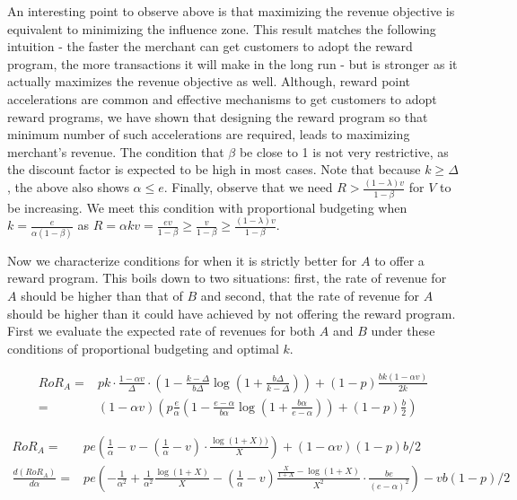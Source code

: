 An interesting point to observe above is that maximizing the revenue objective is equivalent to minimizing the influence zone.
This result matches the following intuition - the faster the merchant can get customers to adopt the reward program, the more transactions it will make in the long run - but is stronger as it actually maximizes the revenue objective as well. 
Although, reward point accelerations are common and effective mechanisms to get customers to adopt reward programs, we have shown that designing the reward program so that minimum number of such accelerations are required, leads to maximizing merchant's revenue. 
The condition that $\beta$ be close to 1 is not very restrictive, as the discount factor is expected to be high in most cases. 
Note that because $k \geq \Delta$, the above also shows $\alpha \leq e$. 
Finally, observe that we need $R > \frac{(1-\lambda)v}{1-\beta}$ for $V$ to be increasing. 
We meet this condition with proportional budgeting when $k = \frac{e}{\alpha(1-\beta)}$ as $R = \alpha k v = \frac{e v}{1-\beta} \geq \frac{v}{1-\beta} \geq \frac{(1-\lambda)v}{1-\beta}$. 

Now we characterize conditions for when it is strictly better for $A$ to offer a reward program.
This boils down to two situations: first, the rate of revenue for $A$ should be higher than that of $B$ and second, that the rate of revenue for $A$ should be higher than it could have achieved by not offering the reward program.
First we evaluate the expected rate of revenues for both $A$ and $B$ under these conditions of proportional budgeting and optimal $k$.

\begin{align*}
RoR_A =& pk\cdot\frac{1-\alpha v}{\Delta}\cdot\left(1 - \frac{k-\Delta}{b\Delta}\log\left(1+\frac{b\Delta}{k-\Delta}\right)\right) + (1-p)\frac{bk(1-\alpha v)}{2k}\\
      =& (1-\alpha v) \left(p\frac{e}{\alpha}\left(1-\frac{e-\alpha}{b\alpha}\log\left(1+\frac{b\alpha}{e-\alpha}\right)\right) + (1-p)\frac{b}{2}\right)
\end{align*}

\begin{align*}
RoR_A =& pe \left(\frac{1}{\alpha} - v - \left(\frac{1}{\alpha} - v\right)\cdot \frac{\log(1+X))}{X}\right) + (1-\alpha v)(1-p)b/2\\
\frac{d(RoR_A)}{d\alpha} =& pe\left(-\frac{1}{\alpha^2} + \frac{1}{\alpha^2} \frac{\log(1+X)}{X} - \left(\frac{1}{\alpha} - v\right)\frac{\frac{X}{1+X} - \log(1+X)}{X^2}\cdot \frac{be}{(e-\alpha)^2}\right) - vb(1-p)/2\\
\end{align*}

